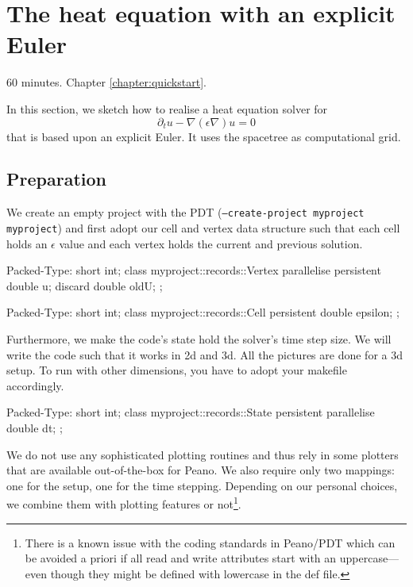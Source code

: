 
\section{The heat equation with an explicit Euler}
  \label{section:applications:heat-equation}

\chapterDescription
  {
    60 minutes.
  }
  {
    Chapter \ref{chapter:quickstart}.
  }

In this section, we sketch how to realise a heat equation solver for
\[
  \partial _t u - \nabla (\epsilon \nabla) u = 0
\]
that is based
upon an explicit Euler.
It uses the spacetree as computational grid.


\subsection{Preparation}

We create an empty project with the PDT (\texttt{--create-project myproject
myproject}) and first adopt our cell and vertex data structure such that each
cell holds an $\epsilon$ value and each vertex holds the current and previous
solution.

\begin{code}
Packed-Type: short int;
class myproject::records::Vertex {
  parallelise persistent double  u;
  discard                double  oldU;
};
\end{code}


\begin{code}
Packed-Type: short int;
class myproject::records::Cell {
  persistent double epsilon;
};
\end{code}


\noindent
Furthermore, we make the code's state hold the solver's time step size. We will
write the code such that it works in 2d and 3d. All the pictures are done for a
3d setup. To run with other dimensions, you have to adopt your makefile
accordingly.


\begin{code}
Packed-Type: short int;
class myproject::records::State { 
  persistent parallelise double dt;
};
\end{code}


\noindent
We do not use any sophisticated plotting routines and thus rely in some plotters
that are available out-of-the-box for Peano.
We also require only two mappings: one for the setup, one for the time stepping. 
Depending on our personal choices, we combine them with plotting features or
not\footnote{There is a known issue with the coding standards in Peano/PDT
which can be avoided a priori if all read and write attributes start with an
uppercase---even though they might be defined with lowercase in the def file.}.

